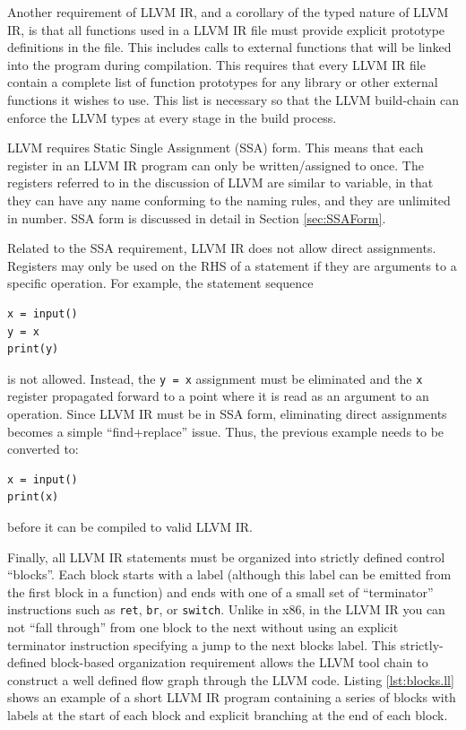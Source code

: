\documentclass[11pt,twocolumn]{article}
\begin{document}
Another requirement of LLVM IR, and a corollary of the typed nature of
LLVM IR, is that all functions used in a LLVM IR file must provide
explicit prototype definitions in the file. This includes calls to
external functions that will be linked into the program during
compilation. This requires that every LLVM IR file contain a
complete list of function prototypes for any library or other external
functions it wishes to use. This list is necessary so that the LLVM
build-chain can enforce the LLVM types at every stage in the build
process.

LLVM requires Static Single Assignment (SSA) form. This means that
each register in an LLVM IR program can only be
written/assigned to once. The registers referred to in the discussion of
LLVM are similar to variable, in that they can have any name conforming to 
the naming rules, and they are unlimited in number. SSA form is discussed
in detail in Section
\ref{sec:SSAForm}.

Related to the SSA requirement, LLVM IR does not allow direct
assignments. Registers may only be used on the RHS of a statement if
they are arguments to a specific operation. For example, the statement sequence
\begin{verbatim}
x = input()
y = x
print(y)
\end{verbatim} 
is not allowed. Instead, the \texttt{y = x} assignment must be
eliminated and the \texttt{x} register propagated forward to a point
where it is read as an argument to an operation. Since LLVM IR must be
in SSA form, eliminating direct assignments becomes a simple
``find+replace'' issue. Thus, the previous example needs to be
converted to:
\begin{verbatim}
x = input()
print(x)
\end{verbatim}
before it can be compiled to valid LLVM IR.

Finally, all LLVM IR statements must be organized into strictly
defined control ``blocks''. Each block starts with a label (although
this label can be emitted from the first block in a function) and ends
with one of a small set of ``terminator'' instructions such as
\texttt{ret}, \texttt{br}, or \texttt{switch}. Unlike in x86, in the LLVM
IR you can not ``fall through'' from one block to the next without using
an explicit terminator instruction specifying a jump to the next
blocks label. This strictly-defined block-based organization
requirement allows the LLVM tool chain to construct a well defined
flow graph through the LLVM code. Listing \ref{lst:blocks.ll} shows an
example of a short LLVM IR program containing a series of blocks with
labels at the start of each block and explicit branching at the end of
each block.
\end{document}
